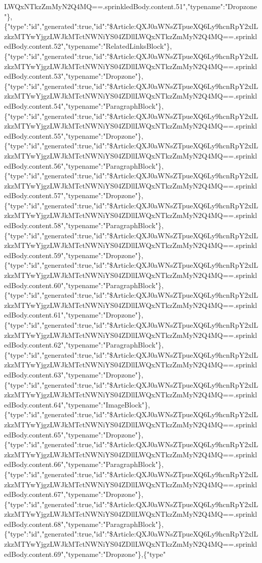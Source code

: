 LWQxNTkzZmMyN2Q4MQ==.sprinkledBody.content.51","typename":"Dropzone"\},\{"type":"id","generated":true,"id":"\$Article:QXJ0aWNsZTpueXQ6Ly9hcnRpY2xlLzkzMTYwYjgzLWJkMTctNWNiYS04ZDllLWQxNTkzZmMyN2Q4MQ==.sprinkledBody.content.52","typename":"RelatedLinksBlock"\},\{"type":"id","generated":true,"id":"\$Article:QXJ0aWNsZTpueXQ6Ly9hcnRpY2xlLzkzMTYwYjgzLWJkMTctNWNiYS04ZDllLWQxNTkzZmMyN2Q4MQ==.sprinkledBody.content.53","typename":"Dropzone"\},\{"type":"id","generated":true,"id":"\$Article:QXJ0aWNsZTpueXQ6Ly9hcnRpY2xlLzkzMTYwYjgzLWJkMTctNWNiYS04ZDllLWQxNTkzZmMyN2Q4MQ==.sprinkledBody.content.54","typename":"ParagraphBlock"\},\{"type":"id","generated":true,"id":"\$Article:QXJ0aWNsZTpueXQ6Ly9hcnRpY2xlLzkzMTYwYjgzLWJkMTctNWNiYS04ZDllLWQxNTkzZmMyN2Q4MQ==.sprinkledBody.content.55","typename":"Dropzone"\},\{"type":"id","generated":true,"id":"\$Article:QXJ0aWNsZTpueXQ6Ly9hcnRpY2xlLzkzMTYwYjgzLWJkMTctNWNiYS04ZDllLWQxNTkzZmMyN2Q4MQ==.sprinkledBody.content.56","typename":"ParagraphBlock"\},\{"type":"id","generated":true,"id":"\$Article:QXJ0aWNsZTpueXQ6Ly9hcnRpY2xlLzkzMTYwYjgzLWJkMTctNWNiYS04ZDllLWQxNTkzZmMyN2Q4MQ==.sprinkledBody.content.57","typename":"Dropzone"\},\{"type":"id","generated":true,"id":"\$Article:QXJ0aWNsZTpueXQ6Ly9hcnRpY2xlLzkzMTYwYjgzLWJkMTctNWNiYS04ZDllLWQxNTkzZmMyN2Q4MQ==.sprinkledBody.content.58","typename":"ParagraphBlock"\},\{"type":"id","generated":true,"id":"\$Article:QXJ0aWNsZTpueXQ6Ly9hcnRpY2xlLzkzMTYwYjgzLWJkMTctNWNiYS04ZDllLWQxNTkzZmMyN2Q4MQ==.sprinkledBody.content.59","typename":"Dropzone"\},\{"type":"id","generated":true,"id":"\$Article:QXJ0aWNsZTpueXQ6Ly9hcnRpY2xlLzkzMTYwYjgzLWJkMTctNWNiYS04ZDllLWQxNTkzZmMyN2Q4MQ==.sprinkledBody.content.60","typename":"ParagraphBlock"\},\{"type":"id","generated":true,"id":"\$Article:QXJ0aWNsZTpueXQ6Ly9hcnRpY2xlLzkzMTYwYjgzLWJkMTctNWNiYS04ZDllLWQxNTkzZmMyN2Q4MQ==.sprinkledBody.content.61","typename":"Dropzone"\},\{"type":"id","generated":true,"id":"\$Article:QXJ0aWNsZTpueXQ6Ly9hcnRpY2xlLzkzMTYwYjgzLWJkMTctNWNiYS04ZDllLWQxNTkzZmMyN2Q4MQ==.sprinkledBody.content.62","typename":"ParagraphBlock"\},\{"type":"id","generated":true,"id":"\$Article:QXJ0aWNsZTpueXQ6Ly9hcnRpY2xlLzkzMTYwYjgzLWJkMTctNWNiYS04ZDllLWQxNTkzZmMyN2Q4MQ==.sprinkledBody.content.63","typename":"Dropzone"\},\{"type":"id","generated":true,"id":"\$Article:QXJ0aWNsZTpueXQ6Ly9hcnRpY2xlLzkzMTYwYjgzLWJkMTctNWNiYS04ZDllLWQxNTkzZmMyN2Q4MQ==.sprinkledBody.content.64","typename":"ImageBlock"\},\{"type":"id","generated":true,"id":"\$Article:QXJ0aWNsZTpueXQ6Ly9hcnRpY2xlLzkzMTYwYjgzLWJkMTctNWNiYS04ZDllLWQxNTkzZmMyN2Q4MQ==.sprinkledBody.content.65","typename":"Dropzone"\},\{"type":"id","generated":true,"id":"\$Article:QXJ0aWNsZTpueXQ6Ly9hcnRpY2xlLzkzMTYwYjgzLWJkMTctNWNiYS04ZDllLWQxNTkzZmMyN2Q4MQ==.sprinkledBody.content.66","typename":"ParagraphBlock"\},\{"type":"id","generated":true,"id":"\$Article:QXJ0aWNsZTpueXQ6Ly9hcnRpY2xlLzkzMTYwYjgzLWJkMTctNWNiYS04ZDllLWQxNTkzZmMyN2Q4MQ==.sprinkledBody.content.67","typename":"Dropzone"\},\{"type":"id","generated":true,"id":"\$Article:QXJ0aWNsZTpueXQ6Ly9hcnRpY2xlLzkzMTYwYjgzLWJkMTctNWNiYS04ZDllLWQxNTkzZmMyN2Q4MQ==.sprinkledBody.content.68","typename":"ParagraphBlock"\},\{"type":"id","generated":true,"id":"\$Article:QXJ0aWNsZTpueXQ6Ly9hcnRpY2xlLzkzMTYwYjgzLWJkMTctNWNiYS04ZDllLWQxNTkzZmMyN2Q4MQ==.sprinkledBody.content.69","typename":"Dropzone"\},\{"type"